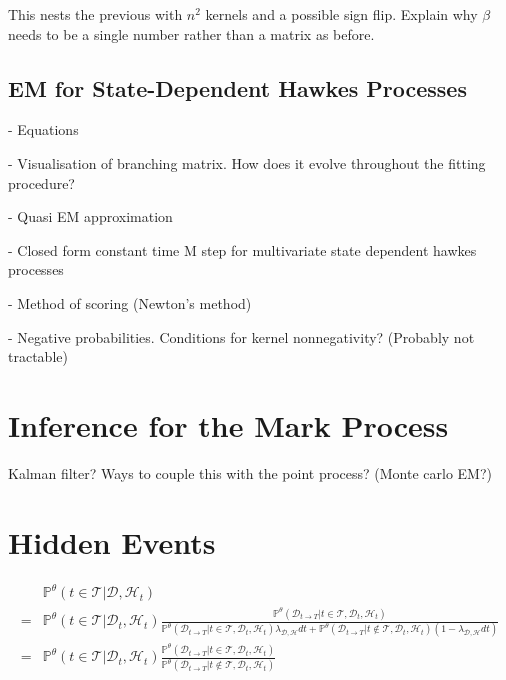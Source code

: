 \documentclass[honours,12pt]{unswthesis}
\numberwithin{equation}{section}
\begin{document}
This nests the previous with $n^2$ kernels and a possible sign flip. Explain why $\beta$ needs to be a single number rather than a matrix as before.

\subsection{EM for State-Dependent Hawkes Processes}
- Equations

- Visualisation of branching matrix. How does it evolve throughout the fitting procedure?

- Quasi EM approximation

- Closed form constant time M step for multivariate state dependent hawkes processes

- Method of scoring (Newton's method)

- Negative probabilities. Conditions for kernel nonnegativity? (Probably not tractable)

\section{Inference for the Mark Process}
Kalman filter? Ways to couple this with the point process? (Monte carlo EM?)

\section{Hidden Events}
\begin{equation*}
	\begin{align}
		& \mathbb{P}^\theta(t\in\mathcal{T} \vert \mathcal{D}, \mathcal{H}_t) \\
		= & \mathbb{P}^\theta(t\in\mathcal{T}\vert \mathcal{D}_t, \mathcal{H}_t) \frac{\mathbb{P}^\theta(\mathcal{D}_{t\to T} \vert t\in\mathcal{T}, \mathcal{D}_t, \mathcal{H}_t)}{\mathbb{P}^\theta(\mathcal{D}_{t\to T} \vert t\in\mathcal{T}, \mathcal{D}_t, \mathcal{H}_t)\lambda_{\mathcal{D},\mathcal{H}}dt + \mathbb{P}^\theta(\mathcal{D}_{t\to T} \vert t\not\in\mathcal{T}, \mathcal{D}_t, \mathcal{H}_t)(1-\lambda_{\mathcal{D},\mathcal{H}}dt)} \\
		= & \mathbb{P}^\theta(t\in\mathcal{T}\vert \mathcal{D}_t, \mathcal{H}_t) \frac{\mathbb{P}^\theta(\mathcal{D}_{t\to T}\vert t\in\mathcal{T}, \mathcal{D}_t, \mathcal{H}_t)}{\mathbb{P}^\theta(\mathcal{D}_{t\to T}\vert t\not\in\mathcal{T}, \mathcal{D}_t, \mathcal{H}_t)}
	\end{align}
\end{equation*}
\end{document}

